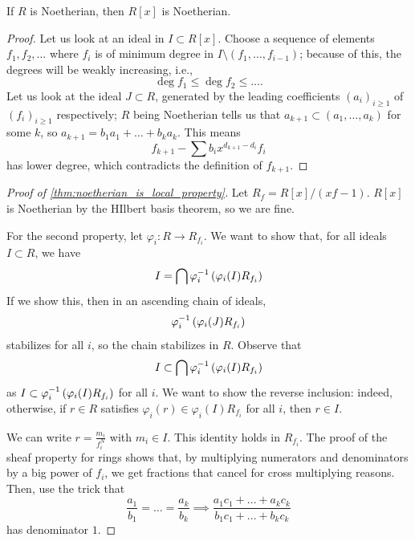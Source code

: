 \newpage
\begin{theorem} \label{thm:hilbert_basis_theorem}
    If $R$ is Noetherian, then $R[x]$ is Noetherian.
\end{theorem}
\begin{proof}
    Let us look at an ideal in $I \subset R[x]$. Choose a sequence of elements $f_1, f_2, \dots$ where $f_i$ is of minimum degree in $I \setminus (f_1, \dots, f_{i-1})$; because of this, the degrees will be weakly increasing, i.e.,
    \[ \deg f_1 \leq \deg f_2 \leq \dots. \]
    Let us look at the ideal $J \subset R$, generated by the leading coefficients $(a_i)_{i \geq 1}$ of $(f_i)_{i \geq 1}$ respectively; $R$ being Noetherian tells us that $a_{k+1} \subset (a_1, \dots, a_k)$ for some $k$, so $a_{k+1} = b_1a_1 + \dots + b_ka_k$. This means
    \[ f_{k+1} - \sum b_i x^{d_{k+1} - d_i} f_i \]
    has lower degree, which contradicts the definition of $f_{k+1}$.
\end{proof}

\begin{proof}[Proof of \ref{thm:noetherian_is_local_property}]
    Let $R_f = R[x] / (xf - 1)$. $R[x]$ is Noetherian by the HIlbert basis theorem, so we are fine.

    For the second property, let $\varphi_i \colon R \to R_{f_i}$. We want to show that, for all ideals $I \subset R$, we have
    \[ I = \bigcap \varphi_i^{-1} \left(\varphi_i(I) R_{f_i}\right) \]
    If we show this, then in an ascending chain of ideals,
    \[ \varphi_i^{-1}\left(\varphi_i(J) R_{f_i}\right) \]
    stabilizes for all $i$, so the chain stabilizes in $R$. Observe that
    \[ I \subset \bigcap \varphi_i^{-1}\left(\varphi_i(I) R_{f_i}\right) \]
    as $I \subset \varphi_i^{-1}\left(\varphi_i(I) R_{f_i}\right)$ for all $i$. We want to show the reverse inclusion: indeed, otherwise, if $r \in R$ satisfies $\varphi_i(r) \in \varphi_i(I) R_{f_i}$ for all $i$, then $r \in I$.

    We can write $r = \frac{m_i}{f_i^N}$ with $m_i \in I$. This identity holds in $R_{f_i}$. The proof of the sheaf property for rings shows that, by multiplying numerators and denominators by a big power of $f_i$, we get fractions that cancel for cross multiplying reasons. Then, use the trick that
    \[ \frac{a_1}{b_1} = \dots = \frac{a_k}{b_k} \implies \frac{a_1c_1 + \dots + a_k c_k}{b_1c_1 + \dots + b_kc_k} \]
    has denominator $1$.
\end{proof}

